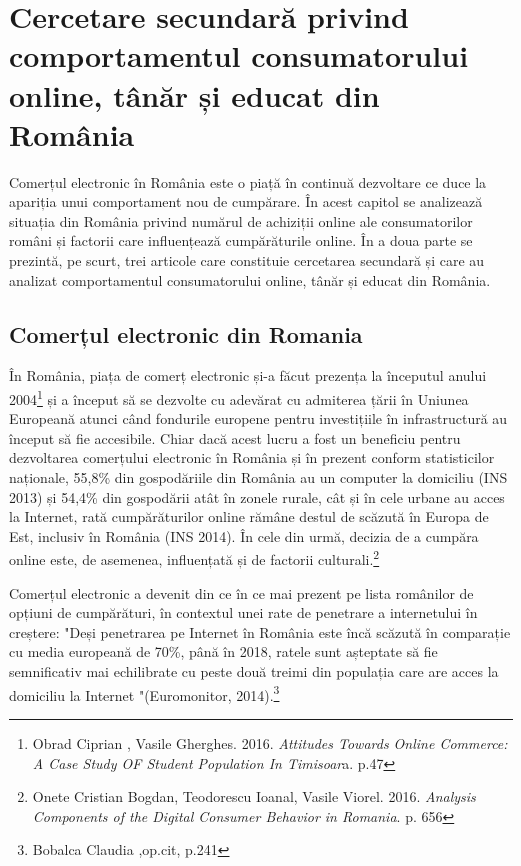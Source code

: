 \documentclass[a4paper, 12pt]{article}
\begin{document}
	\newpage
	\section{Cercetare secundară privind comportamentul consumatorului online, tânăr și educat din România}
	
	\quad\quad Comerțul electronic în România este o piață în continuă dezvoltare ce duce la apariția unui comportament nou de cumpărare. În acest capitol se analizează situația din România privind numărul de achiziții online ale consumatorilor români și factorii care influențează cumpărăturile online. În a doua parte se prezintă, pe scurt, trei articole care constituie cercetarea secundară și care au analizat comportamentul consumatorului online, tânăr și educat din România.
	
	\subsection{Comerțul electronic din Romania}
	\qquad  În România, piața de comerț electronic și-a făcut prezența la începutul anului 2004\footnote{Obrad Ciprian , Vasile Gherghes. 2016. \textit{Attitudes Towards Online Commerce: A Case Study OF Student Population In Timisoar}a. p.47} și a început să se dezvolte cu adevărat cu admiterea țării în Uniunea Europeană atunci când fondurile europene pentru investițiile în infrastructură au început să fie accesibile. Chiar dacă acest lucru a fost un beneficiu pentru dezvoltarea comerțului electronic în România și în prezent conform statisticilor naționale, 55,8\% din gospodăriile din România au un computer la domiciliu (INS 2013) și 54,4\% din gospodării atât în zonele rurale, cât și în cele urbane au acces la Internet, rată cumpărăturilor online rămâne destul de scăzută în Europa de Est, inclusiv în România (INS 2014). În cele din urmă, decizia de a cumpăra online este, de asemenea, influențată și de factorii culturali.\footnote{Onete Cristian Bogdan, Teodorescu Ioanal, Vasile Viorel. 2016. \textit{Analysis Components of the Digital Consumer Behavior in Romania}. p. 656}
	
	\qquad Comerțul electronic a devenit din ce în ce mai prezent pe lista românilor de opțiuni de cumpărături, în contextul unei rate de penetrare a internetului în creștere: "Deși penetrarea pe Internet în România este încă scăzută în comparație cu media europeană de 70\%, până în 2018, ratele sunt așteptate să fie semnificativ mai echilibrate cu peste două treimi din populația care are acces la domiciliu la Internet "(Euromonitor, 2014).\footnote{Bobalca Claudia ,op.cit, p.241}
	
\end{document}
